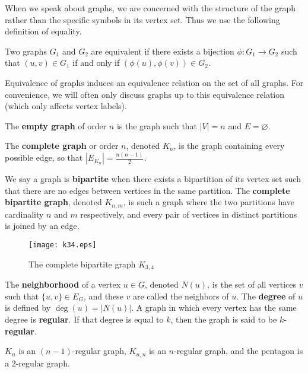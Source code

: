 When we speak about graphs, we are concerned with the structure of the graph
rather than the specific symbols in its vertex set. Thus we use the following
definition of equality.

\begin{definition}
  Two graphs $G_1$ and $G_2$ are equivalent if there exists a bijection $\phi : G_1 \to G_2$
  such that $(u,v) \in G_1$ if and only if $(\phi(u),\phi(v)) \in G_2$.
\end{definition}

Equivalence of graphs induces an equivalence relation on the set of all graphs. For convenience, we
will often only discuss graphs up to this equivalence relation (which only affects vertex labels).

\begin{example}
  The \textbf{empty graph} of order $n$ is the graph such that $|V| = n$ and $E
  = \varnothing$.

  The \textbf{complete graph} or order $n$, denoted $K_n$, is the graph containing every possible
  edge, so that $|E_{K_n}| = \frac{n(n-1)}{2}$.

  We say a graph is \textbf{bipartite} when there exists a bipartition of its vertex set such that
  there are no edges between vertices in the same partition. The \textbf{complete bipartite graph},
  denoted $K_{n,m}$, is such a graph where the two partitions have cardinality $n$ and $m$
  respectively, and every pair of vertices in distinct partitions is joined by an edge.
\end{example}

\begin{figure}[H]
  \centering
  \texttt{[image: k34.eps]}
  \caption{The complete bipartite graph $K_{3,4}$}
  \label{fig:k34}
\end{figure}

\begin{definition}
  The \textbf{neighborhood} of a vertex $u \in G$, denoted $N(u)$, is the set of all vertices $v$
  such that $\{u,v\} \in E_G$, and these $v$ are called the neighbors of $u$. The \textbf{degree} of
  $u$ is defined by $\deg(u) = |N(u)|$. A graph in which every vertex has the same degree is
  \textbf{regular}. If that degree is equal to $k$, then the graph is said to be $k$-\textbf{regular}.
\end{definition}

\begin{example}
  $K_n$ is an $(n-1)$-regular graph, $K_{n,n}$ is an $n$-regular graph, and the pentagon is a
  $2$-regular graph.
\end{example}

